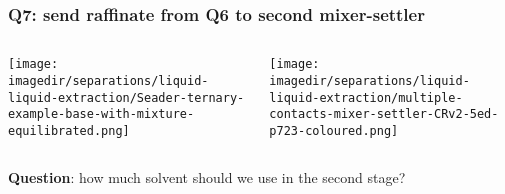 \begin{frame}\frametitle{Q7: send raffinate from Q6 to second mixer-settler}

	\begin{columns}[t]
			\begin{center}
				\texttt{[image: \\imagedir/separations/liquid-liquid-extraction/Seader-ternary-example-base-with-mixture-equilibrated.png]}
			\end{center}
			\begin{center}
				\hspace{-3cm}
				\vspace{24pt}
				\texttt{[image: \\imagedir/separations/liquid-liquid-extraction/multiple-contacts-mixer-settler-CRv2-5ed-p723-coloured.png]}
			\end{center}
	\end{columns}
	\vspace{12pt}
	\textbf{Question}: how much solvent should we use in the second stage?	
\end{frame}

